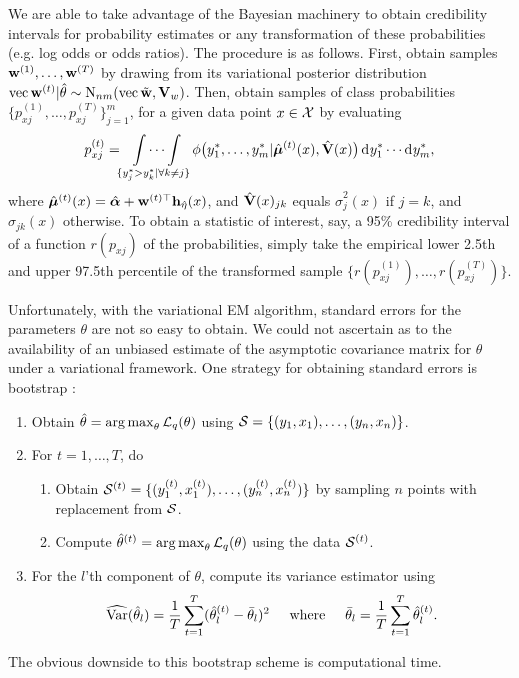 We are able to take advantage of the Bayesian machinery to obtain credibility intervals for probability estimates or any transformation of these probabilities (e.g. log odds or odds ratios).
The procedure is as follows.
First, obtain samples ${\mathbf w}^{(1)},\dots,{\mathbf w}^{(T)}$ by drawing from its variational posterior distribution $\operatorname{vec}{\mathbf w}^{(t)}|\hat\theta \sim \operatorname{N}_{nm}(\operatorname{vec} \tilde{{\mathbf w}},{\mathbf V}_w)$.
Then, obtain samples of class probabilities $\{p_{xj}^{(1)},\dots, p_{xj}^{(T)} \}_{j=1}^m$, for a given data point $x\in{\mathcal X}$ by evaluating
\[
  p_{xj}^{(t)} = \idotsint\displaylimits_{\{y^*_j > y^*_k | \forall k \neq j \}} \phi\big(y_{1}^*, \dots, y_{m}^*|\hat{{\bm\mu}}^{(t)}(x), \hat{{\mathbf V}}(x)\big) \operatorname{d}\hspace{0.5pt}\! y_{1}^* \cdots \operatorname{d}\hspace{0.5pt}\! y_{m}^*,
\]
where $\hat{{\bm\mu}}^{(t)}(x) = \hat{{\bm\alpha}} + {\mathbf w}^{(t)\top}{\mathbf h}_{\hat\eta}(x)$, and $\hat{{\mathbf V}}(x)_{jk}$ equals $\hat\sigma^2_j(x)$ if $j = k$, and $\hat\sigma_{jk}(x)$ otherwise.
To obtain a statistic of interest, say, a 95\% credibility interval of a function $r(p_{xj})$ of the probabilities, simply take the empirical lower 2.5th and upper 97.5th percentile of the transformed sample $\big\{ r(p_{xj}^{(1)}),\dots, r(p_{xj}^{(T)}) \big\}$.

\begin{remark}
  Unfortunately, with the variational EM algorithm, standard errors for the parameters $\theta$ are not so easy to obtain.  
  We could not ascertain as to the availability of an unbiased estimate of the asymptotic covariance matrix for $\theta$ under a variational framework.
  One strategy for obtaining standard errors is bootstrap \citep{chen2017use}:
  \begin{enumerate}
    \item Obtain $\hat\theta = \operatorname*{arg\,max}_\theta {\mathcal L}_q(\theta)$ using ${\mathcal S} = \{(y_1,x_1),\dots, (y_n,x_n)\}$.
    \item For $t=1,\dots,T$, do
    \begin{enumerate}
      \item Obtain ${\mathcal S}^{(t)} = \{ (y_1^{(t)},x_1^{(t)}),\dots, (y_n^{(t)},x_n^{(t)})\}$ by sampling $n$ points with replacement from ${\mathcal S}$.
      \item Compute $\hat\theta^{(t)} = \operatorname*{arg\,max}_\theta {\mathcal L}_q(\theta)$ using the data ${\mathcal S}^{(t)}$.
    \end{enumerate}
    \item For the $l$'th component of $\theta$, compute its variance estimator using
    \[
      \widehat{\operatorname{Var}}(\hat\theta_l) = \frac{1}{T} \sum_{t=1}^T (\hat\theta_l^{(t)} - \bar\theta_l)^2
      \hspace{0.5cm}\text{where}\hspace{0.5cm}
      \bar\theta_l = \frac{1}{T} \sum_{t=1}^T \hat\theta_l^{(t)}.
    \]
  \end{enumerate}
  The obvious downside to this bootstrap scheme is computational time.
\end{remark}

